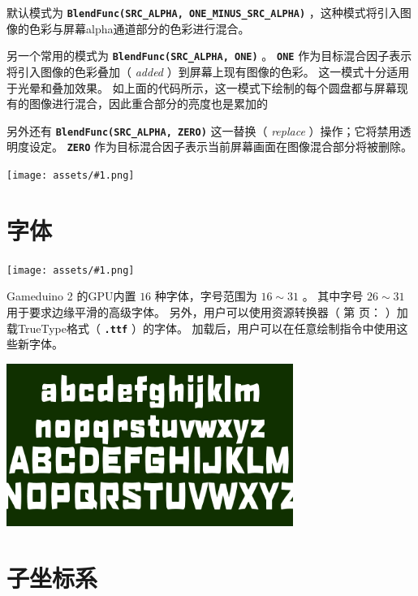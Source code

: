 \documentclass[10pt]{book}
\newcommand{\gdtwo}{Gameduino 2 }
\newcommand{\png}[1]{
\begin{center}
\texttt{[image: assets/\#1.png]}
\end{center}
}
\newcommand{\mach}[1]{\texttt{\textbf{#1}}}
\newcommand{\xref}[1]{第 \pageref{#1} 页：\textit{\nameref{#1}}}
\newcommand{\term}[1]{\emph{#1}\index{#1}}
\begin{document}
\begin{CJK}{UTF8}{gkai}
\begin{center}
\end{center}

默认模式为 \mach{BlendFunc(SRC\_ALPHA, ONE\_MINUS\_SRC\_ALPHA)} ，这种模式将引入图像的色彩与屏幕alpha通道部分的色彩进行混合。

另一个常用的模式为 \mach{BlendFunc(SRC\_ALPHA, ONE)} 。
\mach{ONE} 作为目标混合因子表示将引入图像的色彩叠加（ \textit{added} ）到屏幕上现有图像的色彩。
这一模式十分适用于光晕和叠加效果。
如上面的代码所示，这一模式下绘制的每个圆盘都与屏幕现有的图像进行混合，因此重合部分的亮度也是累加的

另外还有 \mach{BlendFunc(SRC\_ALPHA, ZERO)} 这一替换（ \term{replace} ）操作；它将禁用透明度设定。
\mach{ZERO} 作为目标混合因子表示当前屏幕画面在图像混合部分将被删除。

\png{0069}

\newpage
\section{字体}
\png{fonts0}

\gdtwo 的GPU内置 $16$ 种字体，字号范围为 $16\sim31$ 。
其中字号 $26\sim31$ 用于要求边缘平滑的高级字体。
另外，用户可以使用资源转换器（ \xref{assets} ）加载TrueType格式（ \mach{.ttf} ）的字体。
加载后，用户可以在任意绘制指令中使用这些新字体。


\begin{center}
\includegraphics[width=0.7\textwidth]{assets/fonts1.png}
\end{center}

\newpage
\section{子坐标系}


\end{CJK}
\end{document}
